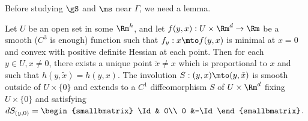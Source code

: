Before studying $\gS$ and $\ms$ near $\Gamma$, we need a lemma.

\begin{lem}\label{lem-sym}
Let $U$ be an open set in some $\Rm^k$, and let $f(y,x):U\times \Rm^d\to \Rm$ be a smooth ($C^3$ is enough) function such that
$f_y:x\mto f(y,x)$ is minimal at $x=0$ and convex with positive definite Hessian at each point.
Then for each $y\in U, x\neq 0$, there exists a unique point $\tilde x \neq x$ which is proportional to $x$ and such that
$h(y,\tilde x)=h(y,x)$.
The involution $S:(y,x)\mto (y,\tilde x)$ is smooth outside of $U\times \{0\}$ and extends to a $C^1$ diffeomorphism $S$ of $U\times\Rm^d$ fixing $U\times \{0\}$
and satisfying $dS_{(y,0)}=
\begin{smallbmatrix} \Id & 0\\ 0 &-\Id\end{smallbmatrix}$.
\end{lem}

